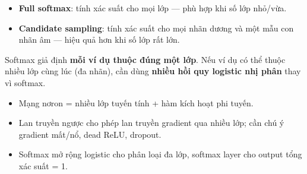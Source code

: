 \documentclass[12pt,a4paper]{article}
\begin{document}
\begin{tinhchat}[title={Biến thể softmax}]
\begin{itemize}
  \item \textbf{Full softmax}: tính xác suất cho mọi lớp --- phù hợp khi số lớp nhỏ/vừa.
  \item \textbf{Candidate sampling}: tính xác suất cho mọi nhãn dương và một mẫu con nhãn âm --- hiệu quả hơn khi số lớp rất lớn.
\end{itemize}
\end{tinhchat}

\begin{luuy}[title={Giới hạn của softmax}]
Softmax giả định \textbf{mỗi ví dụ thuộc đúng một lớp}. Nếu ví dụ có thể thuộc nhiều lớp cùng lúc (đa nhãn), cần dùng \textbf{nhiều hồi quy logistic nhị phân} thay vì softmax.
\end{luuy}

\begin{tongket}[title={Tổng kết chương --- Mạng nơron}]
\begin{itemize}
  \item Mạng nơron = nhiều lớp tuyến tính + hàm kích hoạt phi tuyến.
  \item Lan truyền ngược cho phép lan truyền gradient qua nhiều lớp; cần chú ý gradient mất/nổ, dead ReLU, dropout.
  \item Softmax mở rộng logistic cho phân loại đa lớp, softmax layer cho output tổng xác suất = 1.
\end{itemize}
\end{tongket}
\end{document}
